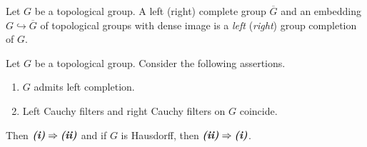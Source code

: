 \documentclass[10pt]{amsart}
\begin{document}
\begin{definition}
	Let $G$ be a topological group. A left (right) complete group $\overline{G}$ and an embedding $G \hookrightarrow \overline{G}$ of topological groups with dense image is a \textit{left} (\textit{right}) group completion of $G$.
\end{definition}

\begin{theorem}\label{theorem:criterion_for_existence_of_one_sided_completions}
	Let $G$ be a topological group. Consider the following assertions.
	\begin{enumerate}[label=\emph{\textbf{(\roman*)}}, leftmargin=*]
		\item $G$ admits left completion.
		\item Left Cauchy filters and right Cauchy filters on $G$ coincide.
	\end{enumerate}
	Then $\emph{\textbf{(i)}} \Rightarrow \emph{\textbf{(ii)}}$ and if $G$ is Hausdorff, then $\emph{\textbf{(ii)}} \Rightarrow \emph{\textbf{(i)}}$.
\end{theorem}
\end{document}
